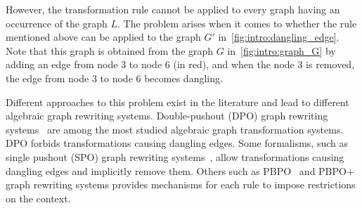 However, the transformation rule cannot be applied to every graph having an occurrence of the graph $L$.
The problem arises when it comes to whether the rule mentioned above can be applied to the graph $G'$ in~\autoref{fig:intro:dangling_edge}. Note that this graph is obtained from the graph $G$ in~\autoref{fig:intro:graph_G} by adding an edge from node 3 to node 6 (in red), and when the node 3 is removed, the edge from node 3 to node 6 becomes dangling.

\begin{figure}[htbp]
   \centering
  \caption{}
  \label{fig:intro:dangling_edge}
\end{figure}

Different approaches to this problem exist in the literature and lead to different algebraic graph rewriting systems.   
Double-pushout (DPO) graph rewriting systems~\cite{corradini1997algebraic,habel2001double} are among the most studied algebraic graph transformation systems. DPO forbids transformations causing dangling edges. Some formalisms, such as single pushout (SPO) graph rewriting systems~\cite{ehrig1997algebraic}, allow transformations causing dangling edges and implicitly remove them. Others such as PBPO~\cite{corradini2019thepbpo} and PBPO+~\cite{overbeek2023graph} graph rewriting systems provides mechanisms for each rule to impose restrictions on the context. 

